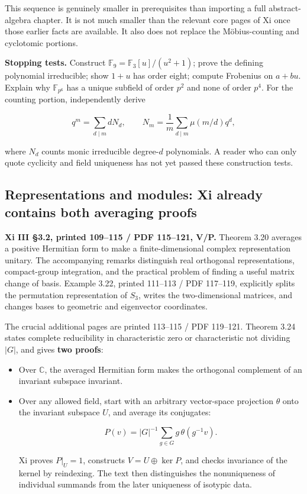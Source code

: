 \documentclass[
  11pt,
]{article}
\begin{document}
This sequence is genuinely smaller in prerequisites than importing a
full abstract-algebra chapter. It is not much smaller than the relevant
core pages of Xi once those earlier facts are available. It also does
not replace the Möbius-counting and cyclotomic portions.

\textbf{Stopping tests.} Construct
\(\mathbb F_9=\mathbb F_3[u]/(u^2+1)\); prove the defining polynomial
irreducible; show \(1+u\) has order eight; compute Frobenius on
\(a+bu\). Explain why \(\mathbb F_{p^6}\) has a unique subfield of order
\(p^2\) and none of order \(p^4\). For the counting portion,
independently derive

\[
q^m=\sum_{d\mid m}dN_d,\qquad
N_m=\frac1m\sum_{d\mid m}\mu(m/d)q^d,
\]

where \(N_d\) counts monic irreducible degree-\(d\) polynomials. A
reader who can only quote cyclicity and field uniqueness has not yet
passed these construction tests.

\subsection{Representations and modules: Xi already contains both
averaging
proofs}\label{representations-and-modules-xi-already-contains-both-averaging-proofs}

\textbf{Xi III §3.2, printed 109--115 / PDF 115--121, V/P.} Theorem 3.20
averages a positive Hermitian form to make a finite-dimensional complex
representation unitary. The accompanying remarks distinguish real
orthogonal representations, compact-group integration, and the practical
problem of finding a useful matrix change of basis. Example 3.22,
printed 111--113 / PDF 117--119, explicitly splits the permutation
representation of \(S_3\), writes the two-dimensional matrices, and
changes bases to geometric and eigenvector coordinates.

The crucial additional pages are printed 113--115 / PDF 119--121.
Theorem 3.24 states complete reducibility in characteristic zero or
characteristic not dividing \(|G|\), and gives \textbf{two proofs}:

\begin{itemize}
\item
  Over \(\mathbb C\), the averaged Hermitian form makes the orthogonal
  complement of an invariant subspace invariant.
\item
  Over any allowed field, start with an arbitrary vector-space
  projection \(\theta\) onto the invariant subspace \(U\), and average
  its conjugates:

  \[
  P(v)=|G|^{-1}\sum_{g\in G}g\,\theta(g^{-1}v).
  \]

  Xi proves \(P|_U=1\), constructs \(V=U\oplus\ker P\), and checks
  invariance of the kernel by reindexing. The text then distinguishes
  the nonuniqueness of individual summands from the later uniqueness of
  isotypic data.
\end{itemize}
\end{document}
